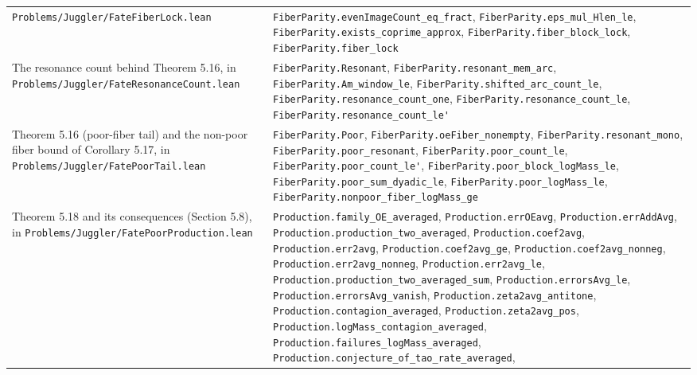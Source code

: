 \documentclass[11pt,a4paper]{article}
\begin{document}
\begin{longtable}[]{@{}
  >{\raggedright\arraybackslash}p{}
  >{\raggedright\arraybackslash}p{}@{}}
\texttt{\nolinkurl{Problems/Juggler/FateFiberLock.lean}} &
\texttt{\nolinkurl{FiberParity.evenImageCount_eq_fract}},
\texttt{\nolinkurl{FiberParity.eps_mul_Hlen_le}},
\texttt{\nolinkurl{FiberParity.exists_coprime_approx}},
\texttt{\nolinkurl{FiberParity.fiber_block_lock}},
\texttt{\nolinkurl{FiberParity.fiber_lock}} \\
The resonance count behind Theorem 5.16, in
\texttt{\nolinkurl{Problems/Juggler/FateResonanceCount.lean}} &
\texttt{\nolinkurl{FiberParity.Resonant}},
\texttt{\nolinkurl{FiberParity.resonant_mem_arc}},
\texttt{\nolinkurl{FiberParity.Am_window_le}},
\texttt{\nolinkurl{FiberParity.shifted_arc_count_le}},
\texttt{\nolinkurl{FiberParity.resonance_count_one}},
\texttt{\nolinkurl{FiberParity.resonance_count_le}},
\texttt{\nolinkurl{FiberParity.resonance_count_le'}} \\
Theorem 5.16 (poor-fiber tail) and the non-poor fiber bound of Corollary
5.17, in \texttt{\nolinkurl{Problems/Juggler/FatePoorTail.lean}} &
\texttt{\nolinkurl{FiberParity.Poor}},
\texttt{\nolinkurl{FiberParity.oeFiber_nonempty}},
\texttt{\nolinkurl{FiberParity.resonant_mono}},
\texttt{\nolinkurl{FiberParity.poor_resonant}},
\texttt{\nolinkurl{FiberParity.poor_count_le}},
\texttt{\nolinkurl{FiberParity.poor_count_le'}},
\texttt{\nolinkurl{FiberParity.poor_block_logMass_le}},
\texttt{\nolinkurl{FiberParity.poor_sum_dyadic_le}},
\texttt{\nolinkurl{FiberParity.poor_logMass_le}},
\texttt{\nolinkurl{FiberParity.nonpoor_fiber_logMass_ge}} \\
Theorem 5.18 and its consequences (Section 5.8), in
\texttt{\nolinkurl{Problems/Juggler/FatePoorProduction.lean}} &
\texttt{\nolinkurl{Production.family_OE_averaged}},
\texttt{\nolinkurl{Production.errOEavg}},
\texttt{\nolinkurl{Production.errAddAvg}},
\texttt{\nolinkurl{Production.production_two_averaged}},
\texttt{\nolinkurl{Production.coef2avg}},
\texttt{\nolinkurl{Production.err2avg}},
\texttt{\nolinkurl{Production.coef2avg_ge}},
\texttt{\nolinkurl{Production.coef2avg_nonneg}},
\texttt{\nolinkurl{Production.err2avg_nonneg}},
\texttt{\nolinkurl{Production.err2avg_le}},
\texttt{\nolinkurl{Production.production_two_averaged_sum}},
\texttt{\nolinkurl{Production.errorsAvg_le}},
\texttt{\nolinkurl{Production.errorsAvg_vanish}},
\texttt{\nolinkurl{Production.zeta2avg_antitone}},
\texttt{\nolinkurl{Production.contagion_averaged}},
\texttt{\nolinkurl{Production.zeta2avg_pos}},
\texttt{\nolinkurl{Production.logMass_contagion_averaged}},
\texttt{\nolinkurl{Production.failures_logMass_averaged}},
\texttt{\nolinkurl{Production.conjecture_of_tao_rate_averaged}},

\end{longtable}
\end{document}
